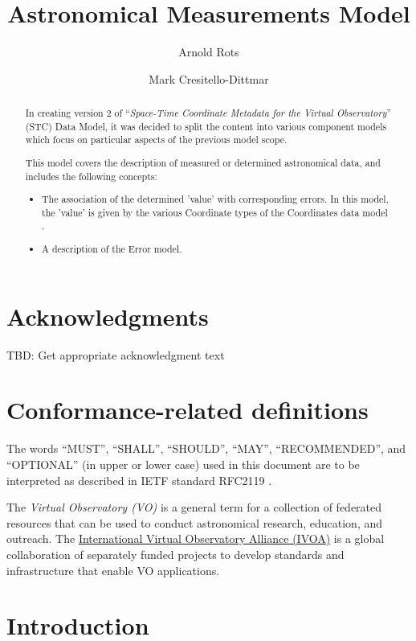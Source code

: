 \documentclass[11pt,a4paper]{ivoa}
\title{Astronomical Measurements Model}
\author{Arnold Rots}
\author{Mark Cresitello-Dittmar}
\begin{document}
\begin{abstract}
  In creating version 2 of ``\emph{Space-Time Coordinate Metadata for the Virtual Observatory}'' (STC) \citep{std:STC} Data Model, it was decided to split the content into various component models which focus on particular aspects of the previous model scope.  
  
  This model covers the description of measured or determined astronomical data, and includes the following concepts:
  \begin{itemize}
  \item The association of the determined 'value' with corresponding errors.  In this model, the 'value' is given by the various Coordinate types of the Coordinates data model \citep{std:Coords}.
  \item A description of the Error model.
  \end{itemize}

\end{abstract}


\section*{Acknowledgments}
TBD: Get appropriate acknowledgment text

\section*{Conformance-related definitions}

The words ``MUST'', ``SHALL'', ``SHOULD'', ``MAY'', ``RECOMMENDED'', and
``OPTIONAL'' (in upper or lower case) used in this document are to be
interpreted as described in IETF standard RFC2119 \citep{std:RFC2119}.

The \emph{Virtual Observatory (VO)} is a
general term for a collection of federated resources that can be used
to conduct astronomical research, education, and outreach.
The \href{http://www.ivoa.net}{International
Virtual Observatory Alliance (IVOA)} is a global
collaboration of separately funded projects to develop standards and
infrastructure that enable VO applications.


\section{Introduction}
\end{document}
